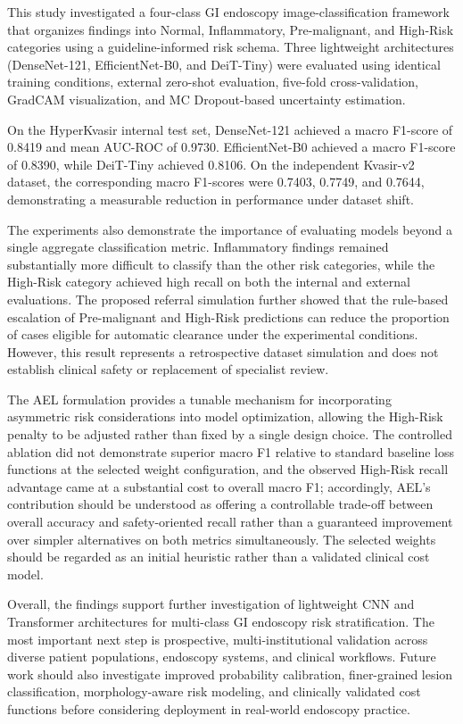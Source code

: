 \documentclass[11pt,a4paper]{article}
\begin{document}
This study investigated a four-class GI endoscopy image-classification
framework that organizes findings into Normal, Inflammatory, Pre-malignant,
and High-Risk categories using a guideline-informed risk schema. Three
lightweight architectures (DenseNet-121, EfficientNet-B0, and DeiT-Tiny)
were evaluated using identical training conditions, external zero-shot
evaluation, five-fold cross-validation, GradCAM visualization, and MC
Dropout-based uncertainty estimation.

On the HyperKvasir internal test set, DenseNet-121 achieved a macro F1-score
of 0.8419 and mean AUC-ROC of 0.9730. EfficientNet-B0 achieved a macro
F1-score of 0.8390, while DeiT-Tiny achieved 0.8106. On the independent
Kvasir-v2 dataset, the corresponding macro F1-scores were 0.7403, 0.7749,
and 0.7644, demonstrating a measurable reduction in performance under dataset
shift.

The experiments also demonstrate the importance of evaluating models beyond
a single aggregate classification metric. Inflammatory findings remained
substantially more difficult to classify than the other risk categories,
while the High-Risk category achieved high recall on both the internal and
external evaluations. The proposed referral simulation further showed that
the rule-based escalation of Pre-malignant and High-Risk predictions can
reduce the proportion of cases eligible for automatic clearance under the
experimental conditions. However, this result represents a retrospective
dataset simulation and does not establish clinical safety or replacement of
specialist review.

The AEL formulation provides a tunable mechanism for incorporating asymmetric
risk considerations into model optimization, allowing the High-Risk penalty
to be adjusted rather than fixed by a single design choice. The controlled
ablation did not demonstrate superior macro F1 relative to standard baseline
loss functions at the selected weight configuration, and the observed
High-Risk recall advantage came at a substantial cost to overall macro F1;
accordingly, AEL's contribution should be understood as offering a
controllable trade-off between overall accuracy and
safety-oriented recall rather than a guaranteed improvement over simpler
alternatives on both metrics simultaneously. The selected weights should be regarded as an initial
heuristic rather than a validated clinical cost model.

Overall, the findings support further investigation of lightweight CNN and
Transformer architectures for multi-class GI endoscopy risk stratification.
The most important next step is prospective, multi-institutional validation
across diverse patient populations, endoscopy systems, and clinical workflows.
Future work should also investigate improved probability calibration,
finer-grained lesion classification, morphology-aware risk modeling, and
clinically validated cost functions before considering deployment in
real-world endoscopy practice.
\end{document}
